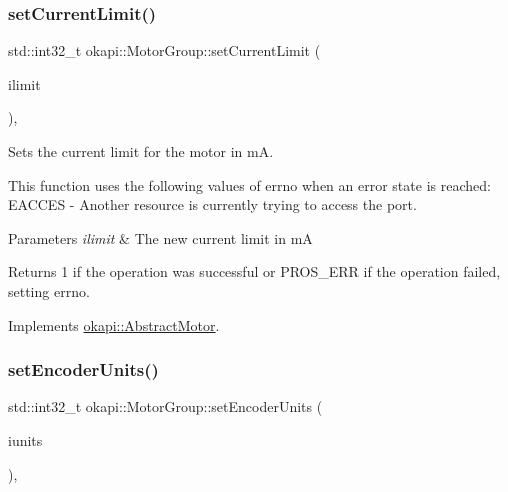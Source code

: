 \subsubsection{\texorpdfstring{setCurrentLimit()}{setCurrentLimit()}}
{\footnotesize\ttfamily std\+::int32\+\_\+t okapi\+::\+Motor\+Group\+::set\+Current\+Limit (\begin{DoxyParamCaption}\item[{std\+::int32\+\_\+t}]{ilimit }\end{DoxyParamCaption})\hspace{0.3cm}{\ttfamily [override]}, {\ttfamily [virtual]}}

Sets the current limit for the motor in mA.

This function uses the following values of errno when an error state is reached\+: E\+A\+C\+C\+ES -\/ Another resource is currently trying to access the port.


\begin{DoxyParams}{Parameters}
{\em ilimit} & The new current limit in mA \\
\hline
\end{DoxyParams}
\begin{DoxyReturn}{Returns}
1 if the operation was successful or P\+R\+O\+S\+\_\+\+E\+RR if the operation failed, setting errno. 
\end{DoxyReturn}


Implements \mbox{\hyperlink{classokapi_1_1AbstractMotor_aec97c81f3d6604363ebc8ceaf425fe39}{okapi\+::\+Abstract\+Motor}}.

\mbox{\label{classokapi_1_1MotorGroup_ad08cc59d805811a81ce5d25580ad0ce0}} 
\subsubsection{\texorpdfstring{setEncoderUnits()}{setEncoderUnits()}}
{\footnotesize\ttfamily std\+::int32\+\_\+t okapi\+::\+Motor\+Group\+::set\+Encoder\+Units (\begin{DoxyParamCaption}\item[{\mbox{\hyperlink{classokapi_1_1AbstractMotor_ae811cd825099f2defadeb1b7f7e7764c}{Abstract\+Motor\+::encoder\+Units}}}]{iunits }\end{DoxyParamCaption})\hspace{0.3cm}{\ttfamily [override]}, {\ttfamily [virtual]}}


